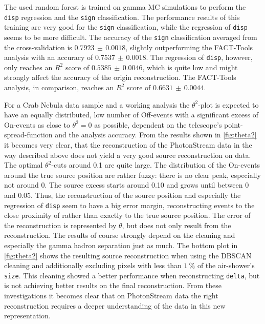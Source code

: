 The used random forest is trained on gamma MC simulations to perform
the \texttt{disp} regression and the \texttt{sign} classification. The
performance results of this training are very good for the \texttt{sign}
classification, while the regression of \texttt{disp} seems to be more
difficult. The accuracy of the \texttt{sign} classification averaged from the
cross-validation is $0.7923\,\pm\,0.0018$, slightly outperforming the FACT-Tools analysis with an accuracy of $0.7537\,\pm\,0.0018$. The regression of
\texttt{disp}, however, only reaches an $R^2$ score of $0.5385\,\pm\,0.0046$,
which is quite low and might strongly affect the accuracy of the origin
reconstruction. The FACT-Tools analysis, in comparison, reaches an $R^2$ score
of $0.6631\,\pm\,0.0044$.

For a Crab Nebula data sample and a working analysis the $\theta^2$-plot is
expected to have an equally distributed, low number of Off-events with a
significant excess of On-events as close to $\theta^2 = 0$ as possible, dependent on the telescope's point-spread-function and the analysis accuracy. From
the results shown in \autoref{fig:theta2} it becomes very clear, that the
reconstruction of the PhotonStream data in the way described above does not
yield a very good source reconstruction on data. The optimal $\theta^2$-cuts
around \num{0.1} are quite large. The distribution of the On-events around the
true source position are rather fuzzy: there is no clear peak, especially not
around \num{0}. The source excess starts around \num{0.10} and grows until
between \num{0} and \num{0.05}. Thus, the reconstruction of the source position
and especially the regression of \texttt{disp} seem to have a big error margin,
reconstructing events to the close proximity of rather than exactly to the true source position. The
error of the reconstruction is represented by $\theta$, but does not only
result from the reconstruction. The results of course strongly depend on the
cleaning and especially the gamma hadron separation just as much. The bottom
plot in \autoref{fig:theta2} shows the resulting source reconstruction when
using the DBSCAN cleaning and additionally excluding pixels with less than
$\SI{1}{\percent}$ of the air-shower's \texttt{size}. This cleaning showed a
better performance when reconstructing \texttt{delta}, but is not achieving
better results on the final reconstruction. From these investigations it becomes clear that on PhotonStream data the right
reconstruction requires a deeper understanding of the data in this new
representation.
%
